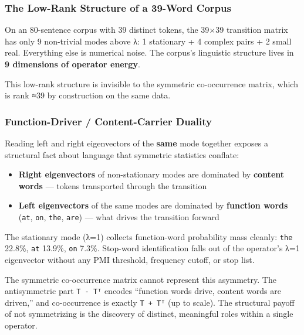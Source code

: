 \documentclass[
  twocolumn,
  10pt,
  a4paper]{article}
\providecommand{\tightlist}{%
  \setlength{\itemsep}{0pt}\setlength{\parskip}{0pt}}
\begin{document}
\hypertarget{the-low-rank-structure-of-a-39-word-corpus}{%
\subsubsection{The Low-Rank Structure of a 39-Word
Corpus}\label{the-low-rank-structure-of-a-39-word-corpus}}

On an 80-sentence corpus with 39 distinct tokens, the 39×39 transition
matrix has only 9 non-trivial modes above \textbar λ: 1
stationary + 4 complex pairs + 2 small real. Everything else is
numerical noise. The corpus's linguistic structure lives in \textbf{9
dimensions of operator energy}.

This low-rank structure is invisible to the symmetric co-occurrence
matrix, which is rank ≈39 by construction on the same data.

\hypertarget{function-driver-content-carrier-duality}{%
\subsubsection{Function-Driver / Content-Carrier
Duality}\label{function-driver-content-carrier-duality}}

Reading left and right eigenvectors of the \textbf{same} mode together
exposes a structural fact about language that symmetric statistics
conflate:

\begin{itemize}
\tightlist
\item
  \textbf{Right eigenvectors} of non-stationary modes are dominated by
  \textbf{content words} --- tokens transported through the transition
\item
  \textbf{Left eigenvectors} of the same modes are dominated by
  \textbf{function words} (\texttt{at}, \texttt{on}, \texttt{the},
  \texttt{are}) --- what drives the transition forward
\end{itemize}

The stationary mode (λ=1) collects function-word probability mass
cleanly: \texttt{the} 22.8\%, \texttt{at} 13.9\%, \texttt{on} 7.3\%.
Stop-word identification falls out of the operator's λ=1 eigenvector
without any PMI threshold, frequency cutoff, or stop list.

The symmetric co-occurrence matrix cannot represent this asymmetry. The
antisymmetric part \texttt{T\ -\ Tᵀ} encodes ``function words drive,
content words are driven,'' and co-occurrence is exactly
\texttt{T\ +\ Tᵀ} (up to scale). The structural payoff of not
symmetrizing is the discovery of distinct, meaningful roles within a
single operator.
\end{document}
